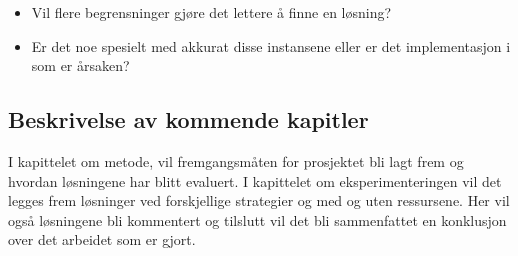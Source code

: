 \begin{itemize}
\item Vil flere begrensninger gjøre det lettere å finne en løsning?
\item Er det noe spesielt med akkurat disse instansene eller er det implementasjon i \ilog som er årsaken?
\end{itemize}

\subsection{Beskrivelse av kommende kapitler}
I kapittelet om metode, vil fremgangsmåten for prosjektet bli lagt frem og hvordan løsningene har blitt evaluert. I kapittelet om eksperimenteringen vil det legges frem løsninger ved forskjellige strategier og med og uten ressursene. Her vil også løsningene bli kommentert og tilslutt vil det bli sammenfattet en konklusjon over det arbeidet som er gjort.